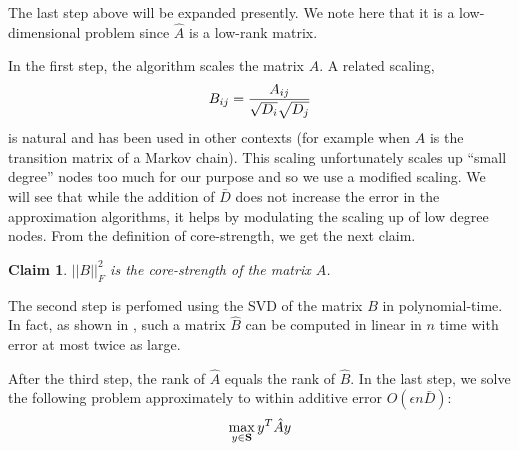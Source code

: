 \documentclass{book}
\newtheorem{claim}{Claim}
\numberwithin{exercise}{chapter}
\begin{document}
\begin{center}
\end{center}

The last step above will be expanded presently. We note here that it is a low-dimensional problem since $\hat{A}$ is a low-rank matrix.

In the first step, the algorithm scales the matrix $A$.
A related scaling,
\[
B_{ij} = {A_{ij}\over \sqrt{D_i}\sqrt{ D_j}}
\]
is natural and has been used in
other contexts (for example when $A$ is the transition
matrix of a Markov chain). This scaling
unfortunately scales up ``small degree'' nodes too much for our purpose
and so we use a modified scaling. We will
see that while the addition of $\bar D$ does not increase
the error in the approximation algorithms, it helps by modulating the
scaling up of low degree nodes. From the definition of core-strength, we get the next claim.
\begin{claim}\label{BF}
$||B||_F^2$ is the core-strength of the matrix $A$.
\end{claim}
%
The second step is perfomed using the SVD of the matrix $B$ in polynomial-time.
In fact, as shown in \cite{FKV04}, such a matrix $\hat{B}$ can be computed in
linear in $n$ time with error at most twice as large.

After the third step, the rank of $\hat A$ equals the rank of $\hat B$.
In the last step, we solve the following problem approximately to within
additive error $O(\epsilon n\bar D)$:
\begin{equation}\label{yThatAy}
\max_{y\in {\bf S}} y^T\hat Ay
\end{equation}
\end{document}
